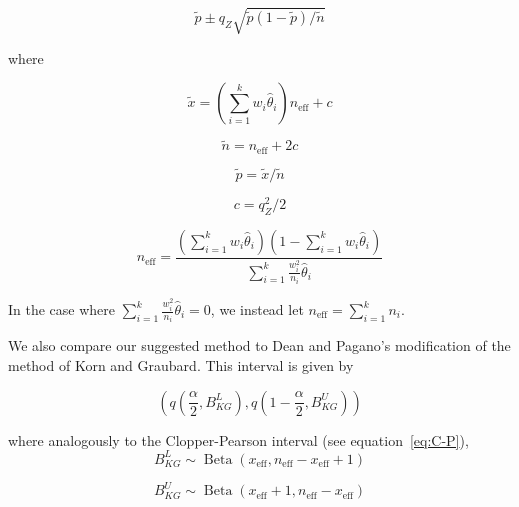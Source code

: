 \documentclass[AMA,STIX1COL]{WileyNJD-v2}
\begin{document}
\begin{equation}
    \tilde{p} \pm q_Z \sqrt{\tilde{p}(1 - \tilde{p}) / \tilde{n}}
\end{equation}

where 

\begin{equation*}
   \tilde{x} = \left( \sum_{i=1}^k w_i \hat{\theta}_i \right) n_{\text{eff}} + c 
\end{equation*}

\begin{equation*}
   \tilde{n} = n_{\text{eff}} + 2c 
\end{equation*}

\begin{equation*}
    \tilde{p} = \tilde{x} / \tilde{n}
\end{equation*}

\begin{equation*}
   c = q_Z^2/2
\end{equation*}

\begin{equation}
   n_{\text{eff}} = \frac{\left( \sum_{i=1}^k w_i \hat{\theta}_i \right) \left(1 - \sum_{i=1}^k w_i \hat{\theta}_i \right)}{\sum_{i=1}^k \frac{w_i^2}{n_i}\hat{\theta}_i} 
   \label{eq:neff}
\end{equation}
 
In the case where \( \sum_{i=1}^k \frac{w_i^2}{n_i}\hat{\theta}_i = 0 \), we instead let \( n_{\text{eff}} = \sum_{i=1}^k n_i \).

We also compare our suggested method to Dean and Pagano's modification of the method of Korn and Graubard\cite{Korn:1998,Dean:2015}.
This interval is given by 

\begin{equation}
    \left( q \left( \frac{\alpha}{2}, B^L_{KG} \right), q \left( 1 - \frac{\alpha}{2}, B^U_{KG} \right)  \right)
\end{equation}

where analogously to the Clopper-Pearson interval (see equation~\ref{eq:C-P}),
\begin{equation*}
    B^L_{KG} \sim \operatorname{Beta}\left(x_{\text{eff}},  n_{\text{eff}} -  x_{\text{eff}} + 1 \right)
\end{equation*}

\begin{equation*}
    B^U_{KG} \sim \operatorname{Beta}\left(x_{\text{eff}} + 1, n_{\text{eff}} - x_{\text{eff}} \right)
\end{equation*}
\end{document}
